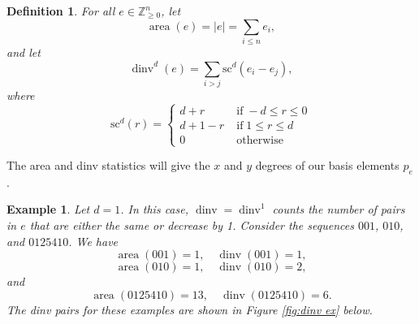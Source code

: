 \documentclass[submission]{FPSAC2027}
\newcommand{\Z}{\mathbb{Z}}
\DeclareMathOperator{\area}{area}
\DeclareMathOperator{\dinv}{dinv}
\newcommand{\scd}{\mathrm{sc}}
\newtheorem{defn}[thm]{Definition}
\newtheorem{example}[thm]{Example}
\begin{document}
\begin{defn}
    For all $e \in \Z_{\geq 0}^n$, let
    $$\area(e) = |e| = \sum_{i \leq n} e_i,$$
    and let
    $$\dinv^d(e) = \sum_{i > j} \scd^d(e_i - e_j),$$
    where
    $$\scd^d(r) = 
    \begin{cases}
    d + r \; & \mathrm{if} \; -d \leq r \leq 0\\
    d + 1 - r \; & \mathrm{if} \; 1 \leq r \leq d\\
    0 \; & \mathrm{otherwise}
    \end{cases}$$
\end{defn}

The area and dinv statistics will give the $x$ and $y$ degrees of our basis elements $p_e$.

\begin{example}
    Let $d=1$. In this case, $\dinv = \dinv^1$ counts the number of pairs in $e$ that are either the same or decrease by 1. Consider the sequences $001$, $010$, and $0125410$. We have 
    $$\area(001) = 1, \quad \dinv(001) = 1,$$
    $$\area(010) = 1, \quad \dinv(010) = 2,$$
    and
    $$\area(0125410) = 13, \quad \dinv(0125410) = 6.$$ The dinv pairs for these examples are shown in Figure \ref{fig:dinv ex} below.
\end{example}
\end{document}
